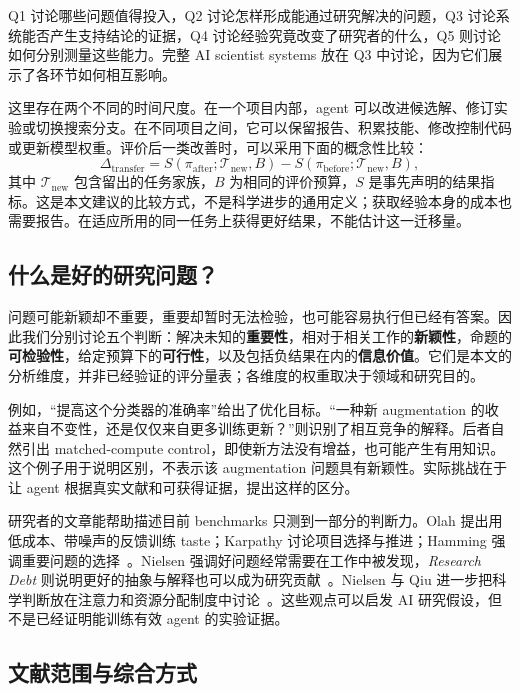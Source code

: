 Q1 讨论哪些问题值得投入，Q2 讨论怎样形成能通过研究解决的问题，Q3 讨论系统能否产生支持结论的证据，Q4 讨论经验究竟改变了研究者的什么，Q5 则讨论如何分别测量这些能力。完整 AI scientist systems 放在 Q3 中讨论，因为它们展示了各环节如何相互影响。

这里存在两个不同的时间尺度。在一个项目内部，agent 可以改进候选解、修订实验或切换搜索分支。在不同项目之间，它可以保留报告、积累技能、修改控制代码或更新模型权重。评价后一类改善时，可以采用下面的概念性比较：
\begin{equation}
\Delta_{\mathrm{transfer}} = S(\pi_{\mathrm{after}};\mathcal{T}_{\mathrm{new}},B)-S(\pi_{\mathrm{before}};\mathcal{T}_{\mathrm{new}},B),
\end{equation}
其中 $\mathcal{T}_{\mathrm{new}}$ 包含留出的任务家族，$B$ 为相同的评价预算，$S$ 是事先声明的结果指标。这是本文建议的比较方式，不是科学进步的通用定义；获取经验本身的成本也需要报告。在适应所用的同一任务上获得更好结果，不能估计这一迁移量。

\subsection{什么是好的研究问题？}

问题可能新颖却不重要，重要却暂时无法检验，也可能容易执行但已经有答案。因此我们分别讨论五个判断：解决未知的\textbf{重要性}，相对于相关工作的\textbf{新颖性}，命题的\textbf{可检验性}，给定预算下的\textbf{可行性}，以及包括负结果在内的\textbf{信息价值}。它们是本文的分析维度，并非已经验证的评分量表；各维度的权重取决于领域和研究目的。

例如，“提高这个分类器的准确率”给出了优化目标。“一种新 augmentation 的收益来自不变性，还是仅仅来自更多训练更新？”则识别了相互竞争的解释。后者自然引出 matched-compute control，即使新方法没有增益，也可能产生有用知识。这个例子用于说明区别，不表示该 augmentation 问题具有新颖性。实际挑战在于让 agent 根据真实文献和可获得证据，提出这样的区分。

研究者的文章能帮助描述目前 benchmarks 只测到一部分的判断力。Olah 提出用低成本、带噪声的反馈训练 taste；Karpathy 讨论项目选择与推进；Hamming 强调重要问题的选择~\cite{colah-taste-exercises,karpathy-phd-guide,hamming-you-and-your-research}。Nielsen 强调好问题经常需要在工作中被发现，\emph{Research Debt} 则说明更好的抽象与解释也可以成为研究贡献~\cite{nielsen-research-heuristics,research-debt}。Nielsen 与 Qiu 进一步把科学判断放在注意力和资源分配制度中讨论~\cite{vision-of-metascience}。这些观点可以启发 AI 研究假设，但不是已经证明能训练有效 agent 的实验证据。

\subsection{文献范围与综合方式}

